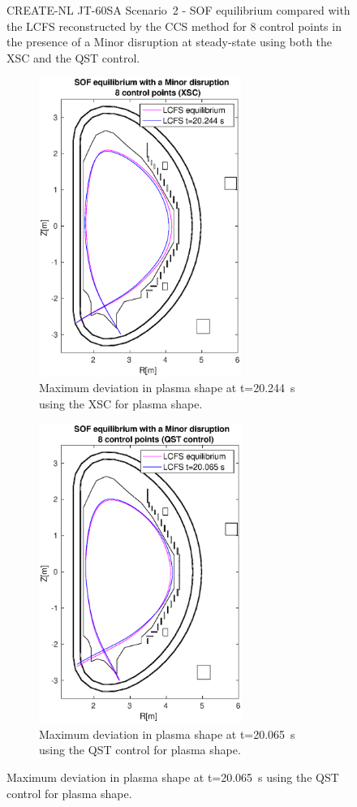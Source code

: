 \begin{figure}[h]
\caption{ CREATE-NL JT-60SA Scenario~2 - SOF equilibrium compared with the LCFS reconstructed by the CCS method for 8 control points in the presence of a Minor disruption at steady-state using both the XSC and the QST control.  \label{compFBC_XSC_ss}}
\end{figure}




\begin{figure}[h]
	\centering
	\begin{subfigure}[b]{0.37\textwidth}
		\includegraphics[trim={3cm 0cm 0cm 0cm},clip,height=9.750cm] {Chp3/Results_iso/8_gaps_mnr_disrp_20.244s.eps}  
		\caption{ Maximum deviation in plasma shape at t=20.244~s using the XSC for plasma shape.
			\label{XSC_20s} }
	\end{subfigure}
	\hspace{2 cm}
	\begin{subfigure}[b]{0.37\textwidth}
		\includegraphics[trim={3cm 0cm 0cm 0cm},clip,height=9.750cm] {Chp3/Results_iso/8_gaps_mnr_disrp_20065sFBC.eps}  
		\caption{Maximum deviation in plasma shape at t=20.065~s using the QST control for plasma shape.
			\label{FBC_20s} }
	\end{subfigure}
	

\end{figure}
